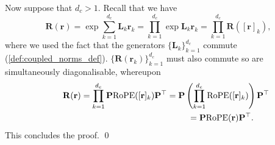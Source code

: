 Now suppose that $d_c>1$. 
Recall that we have
\begin{equation}
    \mathbf{R}(\boldsymbol{r}) = \exp \sum_{k=1}^{d_c} \mathbf{L}_k \boldsymbol{r}_k = \prod_{k=1}^{d_c} \exp \mathbf{L}_k \boldsymbol{r}_k = \prod_{k=1}^{d_c}  \mathbf{R}([\boldsymbol{r}]_k) , 
\end{equation}
where we used the fact that the generators $\{\mathbf{L}_k\}_{k=1}^{d_c}$ commute (\cref{def:coupled_norms_def}).
$\{\mathbf{R}(\mathbf{r}_k)\}_{k=1}^{d_c}$ must also commute so are simultaneously diagonalisable, whereupon
\begin{equation}
\begin{multlined}
    \mathbf{R}(\mathbf{r}) = \prod_{k=1}^{d_c} \mathbf{P} \textrm{RoPE}([\mathbf{r}]_k) \mathbf{P}^\top =  \mathbf{P} \left( \prod_{k=1}^{d_c} \textrm{RoPE}([\mathbf{r}]_k) \right) \mathbf{P}^\top \hspace{-10mm} \\  =  \mathbf{P}  \textrm{RoPE}(\mathbf{r}) \mathbf{P}^\top.
\end{multlined}
\end{equation}
This concludes the proof.
\qed


